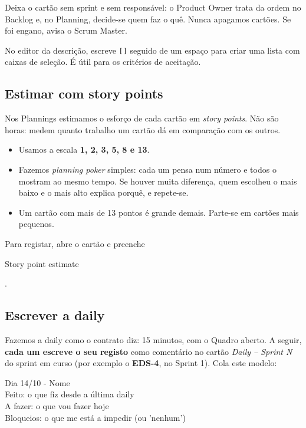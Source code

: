 \documentclass[11pt,a4paper]{article}
\newcommand{\btn}[1]{{\setlength{\fboxsep}{1.6pt}\colorbox{azulclaro}{\sffamily\small\strut #1}}}
\begin{document}
Deixa o cartão sem sprint e sem responsável: o Product Owner trata da ordem no Backlog e, no Planning, decide-se quem faz o quê. Nunca apagamos cartões. Se foi engano, avisa o Scrum Master.

\begin{tcolorbox}[dica, title={Dica: caixas de verificação}]
  No editor da descrição, escreve \texttt{[]} seguido de um espaço para criar uma lista com caixas de seleção. É útil para os critérios de aceitação.
\end{tcolorbox}

\subsection{Estimar com story points}

Nos Plannings estimamos o esforço de cada cartão em \textit{story points}. Não são horas: medem quanto trabalho um cartão dá em comparação com os outros.

\begin{itemize}
  \item Usamos a escala \textbf{1, 2, 3, 5, 8 e 13}.
  \item Fazemos \textit{planning poker} simples: cada um pensa num número e todos o mostram ao mesmo tempo. Se houver muita diferença, quem escolheu o mais baixo e o mais alto explica porquê, e repete-se.
  \item Um cartão com mais de 13 pontos é grande demais. Parte-se em cartões mais pequenos.
\end{itemize}

Para registar, abre o cartão e preenche \btn{Story point estimate}.

\subsection{Escrever a daily}

Fazemos a daily como o contrato diz: 15 minutos, com o Quadro aberto. A seguir, \textbf{cada um escreve o seu registo} como comentário no cartão \textit{Daily – Sprint N} do sprint em curso (por exemplo o \textbf{EDS-4}, no Sprint 1). Cola este modelo:

\begin{codigo}
Dia 14/10 - Nome\\
Feito: o que fiz desde a última daily\\
A fazer: o que vou fazer hoje\\
Bloqueios: o que me está a impedir (ou 'nenhum')
\end{codigo}
\end{document}
